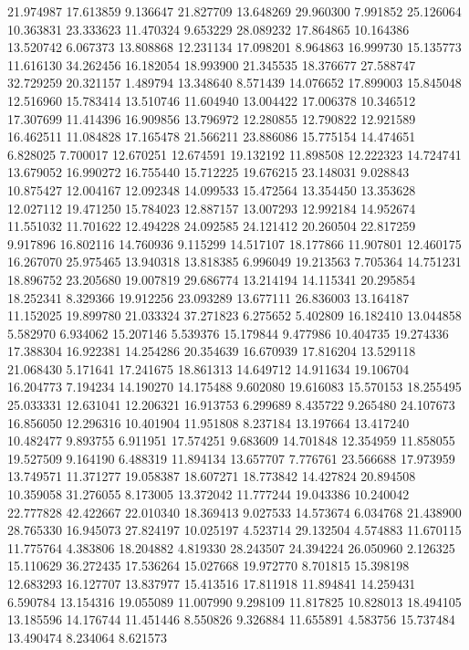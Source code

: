 21.974987
17.613859
9.136647
21.827709
13.648269
29.960300
7.991852
25.126064
10.363831
23.333623
11.470324
9.653229
28.089232
17.864865
10.164386
13.520742
6.067373
13.808868
12.231134
17.098201
8.964863
16.999730
15.135773
11.616130
34.262456
16.182054
18.993900
21.345535
18.376677
27.588747
32.729259
20.321157
1.489794
13.348640
8.571439
14.076652
17.899003
15.845048
12.516960
15.783414
13.510746
11.604940
13.004422
17.006378
10.346512
17.307699
11.414396
16.909856
13.796972
12.280855
12.790822
12.921589
16.462511
11.084828
17.165478
21.566211
23.886086
15.775154
14.474651
6.828025
7.700017
12.670251
12.674591
19.132192
11.898508
12.222323
14.724741
13.679052
16.990272
16.755440
15.712225
19.676215
23.148031
9.028843
10.875427
12.004167
12.092348
14.099533
15.472564
13.354450
13.353628
12.027112
19.471250
15.784023
12.887157
13.007293
12.992184
14.952674
11.551032
11.701622
12.494228
24.092585
24.121412
20.260504
22.817259
9.917896
16.802116
14.760936
9.115299
14.517107
18.177866
11.907801
12.460175
16.267070
25.975465
13.940318
13.818385
6.996049
19.213563
7.705364
14.751231
18.896752
23.205680
19.007819
29.686774
13.214194
14.115341
20.295854
18.252341
8.329366
19.912256
23.093289
13.677111
26.836003
13.164187
11.152025
19.899780
21.033324
37.271823
6.275652
5.402809
16.182410
13.044858
5.582970
6.934062
15.207146
5.539376
15.179844
9.477986
10.404735
19.274336
17.388304
16.922381
14.254286
20.354639
16.670939
17.816204
13.529118
21.068430
5.171641
17.241675
18.861313
14.649712
14.911634
19.106704
16.204773
7.194234
14.190270
14.175488
9.602080
19.616083
15.570153
18.255495
25.033331
12.631041
12.206321
16.913753
6.299689
8.435722
9.265480
24.107673
16.856050
12.296316
10.401904
11.951808
8.237184
13.197664
13.417240
10.482477
9.893755
6.911951
17.574251
9.683609
14.701848
12.354959
11.858055
19.527509
9.164190
6.488319
11.894134
13.657707
7.776761
23.566688
17.973959
13.749571
11.371277
19.058387
18.607271
18.773842
14.427824
20.894508
10.359058
31.276055
8.173005
13.372042
11.777244
19.043386
10.240042
22.777828
42.422667
22.010340
18.369413
9.027533
14.573674
6.034768
21.438900
28.765330
16.945073
27.824197
10.025197
4.523714
29.132504
4.574883
11.670115
11.775764
4.383806
18.204882
4.819330
28.243507
24.394224
26.050960
2.126325
15.110629
36.272435
17.536264
15.027668
19.972770
8.701815
15.398198
12.683293
16.127707
13.837977
15.413516
17.811918
11.894841
14.259431
6.590784
13.154316
19.055089
11.007990
9.298109
11.817825
10.828013
18.494105
13.185596
14.176744
11.451446
8.550826
9.326884
11.655891
4.583756
15.737484
13.490474
8.234064
8.621573
